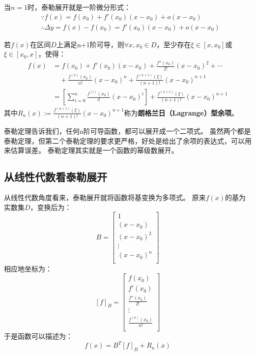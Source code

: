 当$n=1$时，泰勒展开就是一阶微分形式：
\begin{align*}
&\because f\left( x \right) =f\left( x_0 \right) +f'\left( x_0 \right) \left( x-x_0 \right) +o\left( x-x_0 \right) \\
&\therefore \Delta y=f\left( x \right) -f\left( x_0 \right) =f'\left( x_0 \right) \left( x-x_0 \right) +o\left( x-x_0 \right)
\end{align*}

\begin{theorem}[泰勒（Taylor）定理]
若$f\left( x \right) $在区间$D$上满足n+1阶可导，则$\forall x,x_0\in D$，至少存在$\xi \in \left[ x,x_0 \right] $或$\xi \in \left[ x_0,x \right] $，使得：
\begin{align*}
f\left( x \right) &=f\left( x_0 \right) +f'\left( x_0 \right) \left( x-x_0 \right) +\frac{f''\left( x_0 \right)}{2!}\left( x-x_0 \right) ^2+\cdots \\
&\quad +\frac{f^{\left( n \right)}\left( x_0 \right)}{n!}\left( x-x_0 \right) ^n+\frac{f^{\left( n+1 \right)}\left( \xi \right)}{\left( n+1 \right) !}\left( x-x_0 \right) ^{n+1} \\
&=\left[ \sum_{i=0}^n{\frac{f^{\left( i \right)}\left( x_0 \right)}{i!}\left( x-x_0 \right) ^i} \right] +\frac{f^{\left( n+1 \right)}\left( \xi \right)}{\left( n+1 \right) !}\left( x-x_0 \right) ^{n+1}
\end{align*}
其中$R_n\left( x \right) :=\frac{f^{\left( n+1 \right)}\left( \xi \right)}{\left( n+1 \right) !}\left( x-x_0 \right) ^{n+1}$称为{\bf 朗格兰日（Lagrange）型余项}。
\end{theorem}

泰勒定理告诉我们，任何n阶可导函数，都可以展开成一个二项式。
虽然两个都是泰勒定理，但第二个泰勒定理的要求更严格，好处是给出了余项的表达式，可以用来估算误差。
泰勒定理其实就是一个函数的幂级数展开。

\subsection{从线性代数看泰勒展开}

从线性代数角度看来，泰勒展开就将函数将基变换为多项式。
原来$f\left( x \right) $的基为实数集$D$，变换后为：
\[
B=\left[ \begin{array}{c}
	1\\
	\left( x-x_0 \right)\\
	\left( x-x_0 \right) ^2\\
	\vdots\\
	\left( x-x_0 \right) ^n\\
\end{array} \right]
\]
相应地坐标为：
\[
\left[ f \right] _B=\left[ \begin{array}{c}
	f\left( x_0 \right)\\
	f'\left( x_0 \right)\\
	\frac{f''\left( x_0 \right)}{2!}\\
	\vdots\\
	\frac{f^{\left( n \right)}\left( x_0 \right)}{n!}\\
\end{array} \right]
\]
于是函数可以描述为：
\[
f\left( x \right) =B^T\left[ f \right] _B+R_n\left( x \right)
\]

